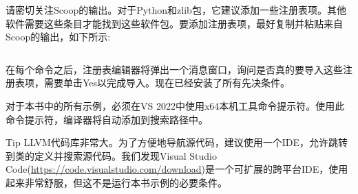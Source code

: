 
请密切关注Scoop的输出。对于Python和zlib包，它建议添加一些注册表项。其他软件需要这些条目才能找到这些软件包。要添加注册表项，最好复制并粘贴来自Scoop的输出，如下所示:

\begin{shell}
$ %
$ %
\end{shell}

在每个命令之后，注册表编辑器将弹出一个消息窗口，询问是否真的要导入这些注册表项，需要单击Yes以完成导入。现在已经安装了所有先决条件。

对于本书中的所有示例，必须在VS 2022中使用x64本机工具命令提示符。使用此命令提示符，编译器将自动添加到搜索路径中。

\begin{myTip}{Tip}
LLVM代码库非常大。为了方便地导航源代码，建议使用一个IDE，允许跳转到类的定义并搜索源代码。我们发现Visual Studio Code(\url{https://code.visualstudio.com/download})是一个可扩展的跨平台IDE，使用起来非常舒服，但这不是运行本书示例的必要条件。
\end{myTip}
